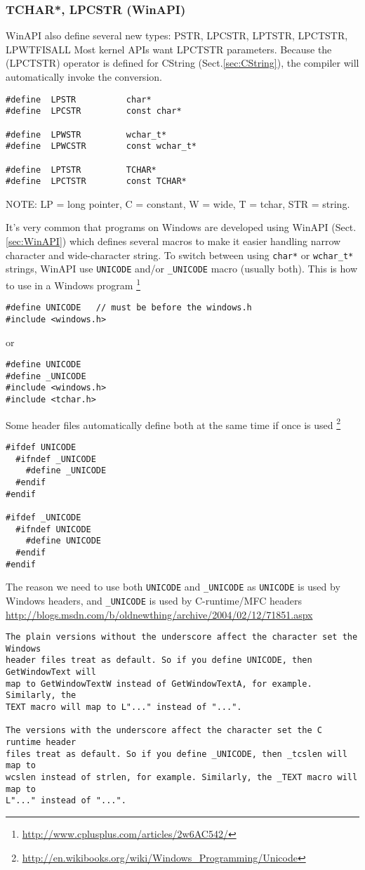 \subsubsection{TCHAR*, LPCSTR (WinAPI)}
\label{sec:TCHAR}

WinAPI also define several new types: PSTR, LPCSTR, LPTSTR, LPCTSTR, LPWTFISALL
Most kernel APIs want LPCTSTR parameters.  Because the (LPCTSTR) operator is
defined for CString (Sect.\ref{sec:CString}), the compiler will automatically
invoke the conversion.

\begin{verbatim}
#define  LPSTR          char*
#define  LPCSTR         const char*

#define  LPWSTR         wchar_t*
#define  LPWCSTR        const wchar_t*

#define  LPTSTR         TCHAR*
#define  LPCTSTR        const TCHAR* 
\end{verbatim}
NOTE: LP = long pointer, C = constant, W = wide, T = tchar, STR = string.

It's very common that programs on Windows are developed using WinAPI
(Sect.\ref{sec:WinAPI}) which defines several macros to make it easier handling
narrow character and wide-character string. To switch between using \verb!char*!
or \verb!wchar_t*! strings, WinAPI use \verb!UNICODE! and/or \verb!_UNICODE!
macro (usually both). This is how to use in a Windows program
\footnote{\url{http://www.cplusplus.com/articles/2w6AC542/}}
\begin{verbatim}
#define UNICODE   // must be before the windows.h
#include <windows.h>
\end{verbatim}
or
\begin{verbatim}
#define UNICODE
#define _UNICODE
#include <windows.h>
#include <tchar.h>
\end{verbatim}

Some header files automatically define both at the same time if once is used 
\footnote{\url{http://en.wikibooks.org/wiki/Windows_Programming/Unicode}}
\begin{verbatim}
#ifdef UNICODE
  #ifndef _UNICODE
    #define _UNICODE
  #endif
#endif

#ifdef _UNICODE
  #ifndef UNICODE
    #define UNICODE
  #endif
#endif 
\end{verbatim}

The reason we need to use both \verb!UNICODE! and \verb!_UNICODE! as
\verb!UNICODE! is used by Windows headers, and \verb!_UNICODE! is used by
C-runtime/MFC headers
\url{http://blogs.msdn.com/b/oldnewthing/archive/2004/02/12/71851.aspx}
\begin{verbatim}
The plain versions without the underscore affect the character set the Windows
header files treat as default. So if you define UNICODE, then GetWindowText will
map to GetWindowTextW instead of GetWindowTextA, for example. Similarly, the
TEXT macro will map to L"..." instead of "...".   

The versions with the underscore affect the character set the C runtime header
files treat as default. So if you define _UNICODE, then _tcslen will map to
wcslen instead of strlen, for example. Similarly, the _TEXT macro will map to
L"..." instead of "...".   
\end{verbatim}

